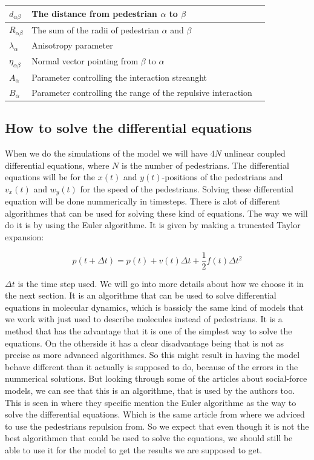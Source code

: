 \begin{center}
\begin{tabular}{lll}
\hline
$d_{\alpha \beta}$& The distance from pedestrian $\alpha$ to $\beta$ &\\
\hline
$R_{\alpha\beta}$& The sum of the radii of pedestrian $\alpha$ and $\beta$ \\
\hline
$\lambda_{\alpha}$& Anisotropy parameter &\\
\hline
$\eta_{\alpha \beta}$& Normal vector pointing from $\beta$ to $\alpha$ \\
\hline
$A_{\alpha}$& Parameter controlling the interaction streanght \\
\hline
$B_{\alpha}$& Parameter controlling the range of the repulsive interaction  \\
\hline
\end{tabular}
\end{center}

\subsection{How to solve the differential equations}

When we do the simulations of the model we will have $4N$ unlinear coupled differential equations, where $N$ is the number of pedestrians. The differential equations will be for the $x(t)$ and $y(t)$-positions of the pedestrians and $v_x(t)$ and $w_y(t)$ for the speed of the pedestrians. Solving these differential equation will be done nummerically in timesteps. There is alot of different algorithmes that can be used for solving these kind of equations. The way we will do it is by using the Euler algorithme. It is given by making a truncated Taylor expansion\cite{MD}:

\begin{equation}
p(t+\Delta t)=p(t)+v(t)\Delta t + \frac{1}{2}f(t)\Delta t^2
\end{equation}     

$\Delta t$ is the time step used. We will go into more details about how we choose it in the next section. 
It is an algorithme that can be used to solve differential equations in molecular dynamics, which is bassicly the same kind of models that we work with just used to describe molecules instead of pedestrians\cite{social-force}. It is a method that has the advantage that it is one of the simplest way to solve the equations.  On the otherside it has a clear disadvantage being that is not as precise as more advanced algorithmes\cite{MD}. So this might result in having the model behave different than it actually is supposed to do, because of the errors in the nummerical solutions. But looking through some of the articles about social-force models, we can see that this is an algorithme, that is used by the authors too. This is seen in \cite{ABconstant} where they specific mention the Euler algorithme as the way to solve the differential equations. Which is the same article from where we adviced to use the pedestrians repulsion from. So we expect that even though it is not the best algorithmen that could be used to solve the equations, we should still be able to use it for the model to get the results we are supposed to get.  


